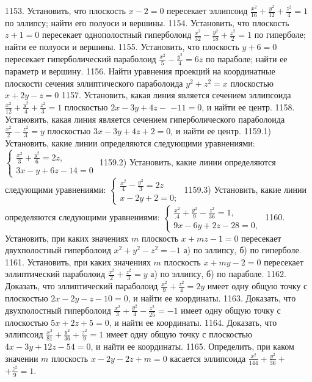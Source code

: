 1153. Установить, что плоскость $x-2=0$ пересекает эллипсоид $\frac{x^2}{16}+\frac{y^2}{12}+\frac{z^2}{4}=1$ по эллипсу; найти его полуоси и вершины.
1154. Установить, что плоскость $z+1=0$ пересекает однополостный гиперболоид $\frac{x^2}{32}-\frac{y^2}{18}+\frac{z^2}{2}=1$ по гиперболе; найти ее полуоси и вершины.
1155. Установить, что плоскость $y+6=0$ пересекает гиперболический параболоид $\frac{x^2}{5}-\frac{y^2}{4}=6 z$ по параболе; найти ее параметр и вершину.
1156. Найти уравнения проекций на координатные плоскости сечения эллиптического параболоида $y^2+z^2=x$ плоскостью $x+2 y-z=0$
1157. Установить, какая линия является сечением эллипсоида $\frac{x^2}{12}+\frac{y^2}{4}+\frac{z^2}{3}=1$ плоскостью $2 x-3 y+4 z-$ $-11=0$, и найти ее центр.
1158. Установить, какая линия является сечением гиперболического параболоида $\frac{x^2}{2}-\frac{z^2}{3}=y$ плоскостью $3 x-3 y+4 z+2=0$, и найти ее центр.
1159.1) Установить, какие линии определяются следующими уравнениями: $\left\{\begin{array}{l}\frac{x^2}{3}+\frac{y^2}{6}=2 z, \\ 3 x-y+6 z-14=0\end{array}\right.$
1159.2) Установить, какие линии определяются следующими уравнениями: $\left\{\begin{array}{l}\frac{x^2}{4}-\frac{y^2}{3}=2 z \\ x-2 y+2=0 ;\end{array}\right.$
1159.3) Установить, какие линии определяются следующими уравнениями: $\left\{\begin{array}{l}\frac{x^2}{.4}+\frac{y^2}{9}-\frac{z^2}{36}=1, \\ 9 x-6 y+2 z-28=0,\end{array}\right.$
1160. Установить, при каких значениях $m$ плоскость $x+m z-1=0$ пересекает двухполостный гиперболоид $x^2+y^2-z^2=-1$ а) по эллипсу, б) по гиперболе.
1161. Установить, при каких значениях $m$ плоскость $x+m y-2=0$ пересекает эллиптический параболоид $\frac{x^2}{2}+\frac{z^2}{3}=y$ а) по эллипсу, б) по параболе.
1162. Доказать, что эллиптический параболоид $\frac{x^2}{9}+\frac{z^2}{4}=2 y$ имеет одну общую точку с плоскостью $2 x-2 y-z-10=0$, и найти ее координаты.
1163. Доказать, что двухполостный гиперболоид $\frac{x^2}{3}+\frac{y^2}{4}-\frac{z^2}{25}=-1$ имеет одну общую точку с плоскостью $5 x+2 z+5=0$, и найти ее координаты.
1164. Доказать, что эллипсоид $\frac{x^2}{81}+\frac{y^2}{36}+\frac{z^2}{9}=1$ имеет одну общую точку с плоскостью $4 x-3 y+12 z-54=0$, и найти ее координаты.
1165. Определить, при каком значении $m$ плоскость $x-2 y-2 z+m=0$ касается эллипсоида $\frac{x^2}{144}+\frac{y^2}{36}+$ $+\frac{z^2}{9}=1$.
